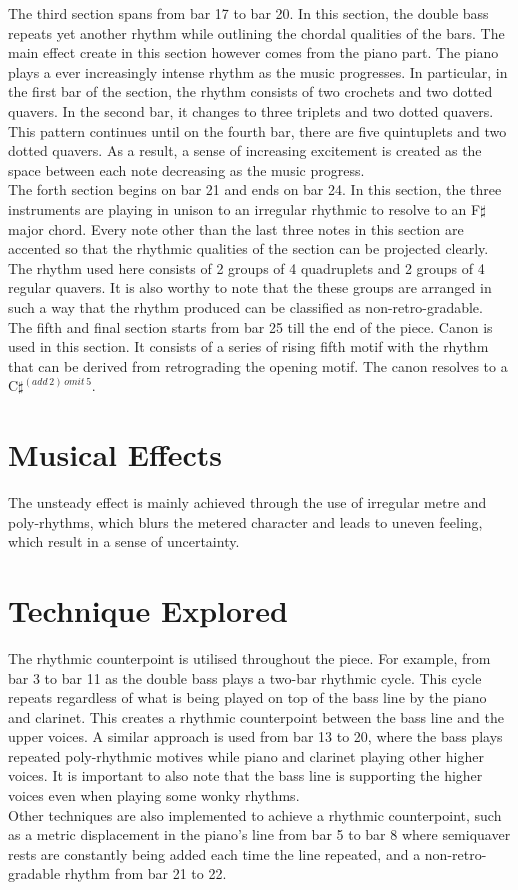 \documentclass[11pt]{article}
\begin{document}
The third section spans from bar 17 to bar 20. In this section, the double bass repeats yet another rhythm while outlining the chordal qualities of the bars. The main effect create in this section however comes from the piano part. The piano plays a ever increasingly intense rhythm as the music progresses. In particular, in the first bar of the section, the rhythm consists of two crochets and two dotted quavers. In the second bar, it changes to three triplets and two dotted quavers. This pattern continues until on the fourth bar, there are five quintuplets and two dotted quavers. As a result, a sense of increasing excitement is created as the space between each note decreasing as the music progress.\\

The forth section begins on bar 21 and ends on bar 24. In this section, the three instruments are playing in unison to an irregular rhythmic to resolve to an F\(\sharp\) major chord. Every note other than the last three notes in this section are accented so that the rhythmic qualities of the section can be projected clearly. The rhythm used here consists of 2 groups of 4 quadruplets and 2 groups of 4 regular quavers. It is also worthy to note that the these groups are arranged in such a way that the rhythm produced can be classified as non-retro-gradable.\\

The fifth and final section starts from bar 25 till the end of the piece. Canon is used in this section. It consists of a series of rising fifth motif with the rhythm that can be derived from retrograding the opening motif.  The canon resolves to a C\(\sharp^{(add\,2)\,omit\,5}\).
\section{Musical Effects}
The unsteady effect is mainly achieved through the use of irregular metre and poly-rhythms, which blurs the metered character and leads to uneven feeling, which result in a sense of uncertainty.
\section{Technique Explored}
The rhythmic counterpoint is utilised throughout the piece. For example, from bar 3 to bar 11 as the double bass plays a two-bar rhythmic cycle. This cycle repeats regardless of what is being played on top of the bass line by the piano and clarinet. This creates a rhythmic counterpoint between the bass line and the upper voices. A similar approach is used from bar 13 to 20, where the bass plays repeated poly-rhythmic motives while piano and clarinet playing other higher voices. It is important to also note that the bass line is supporting the higher voices even when playing some wonky rhythms.\\

Other techniques are also implemented to achieve a rhythmic counterpoint, such as a metric displacement in the piano's line from bar 5 to bar 8 where semiquaver rests are constantly being added each time the line repeated, and a  non-retro-gradable rhythm from bar 21 to 22.
\end{document}
